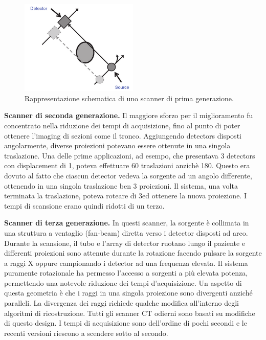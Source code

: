 \documentclass[a4paper,12pt, doubleside]{report}
\begin{document}
                    \begin{figure}[h]
                        \centering
                        \includegraphics[width=0.5\textwidth]{first-generation}
                        \caption{Rappresentazione schematica di uno scanner di prima generazione.}
                        \label{fig:first-generation}
                    \end{figure}
                            
                \bigskip
                \par
                    \textbf{Scanner di seconda generazione.} Il maggiore sforzo per il miglioramento fu concentrato nella riduzione dei tempi di acquisizione, fino al punto di poter ottenere l’imaging di sezioni come il tronco. Aggiungendo detectors disposti angolarmente, diverse proiezioni potevano essere ottenute in una singola traslazione. Una delle prime applicazioni, ad esempo, che presentava 3 detectors con displacement di 1\degree, poteva effettuare 60 traslazioni anzichè 180. Questo era dovuto al fatto che ciascun detector vedeva la sorgente ad un angolo differente, ottenendo in una singola traslazione ben 3 proiezioni. Il sistema, una volta terminata la traslazione, poteva roteare di 3\degree  ed ottenere la nuova proiezione. I tempi di scansione erano quindi ridotti di un terzo. 
                        
                \bigskip
                \par
                    \textbf{Scanner di terza generazione.} In questi scanner, la sorgente è collimata in una struttura a ventaglio (fan-beam) diretta verso i detector disposti ad arco. Durante la scansione, il tubo e l’array di detector ruotano lungo il paziente e differenti proiezioni sono attenute durante la rotazione facendo pulsare la sorgente a raggi X oppure campionando i detector ad una frequenza elevata. Il sistema puramente rotazionale ha permesso l’accesso a sorgenti a più elevata potenza, permettendo una notevole riduzione dei tempi d’acquisizione. Un aspetto di questa geometria è che i raggi in una singola proiezione sono divergenti anziché paralleli. La divergenza dei raggi richiede qualche modifica all’interno degli algoritmi di ricostruzione. Tutti gli scanner CT odierni sono basati su modifiche di questo design. I tempi di acquisizione sono dell’ordine di pochi secondi e le recenti versioni riescono a scendere sotto al secondo.
                            
\end{document}
